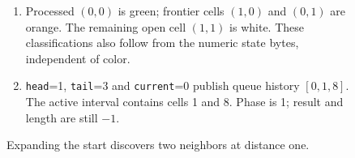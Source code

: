 \begin{figure}[htbp]
\begin{minipage}{\linewidth}
\begin{enumerate}
      \item Processed $(0,0)$ is green; frontier cells $(1,0)$ and $(0,1)$ are orange. The remaining open cell $(1,1)$ is white. These classifications also follow from the numeric state bytes, independent of color.
      \item \texttt{head}=1, \texttt{tail}=3 and \texttt{current}=0 publish queue history $[0,1,8]$. The active interval contains cells 1 and 8. Phase is 1; result and length are still $-1$.
    \end{enumerate}
  \end{minipage}
  \caption{Expanding the start discovers two neighbors at distance one.}
  \label{capture:010-maze-explorer-f02-frontier}
  \label{maze-f02-frontier}
\end{figure}
\par
